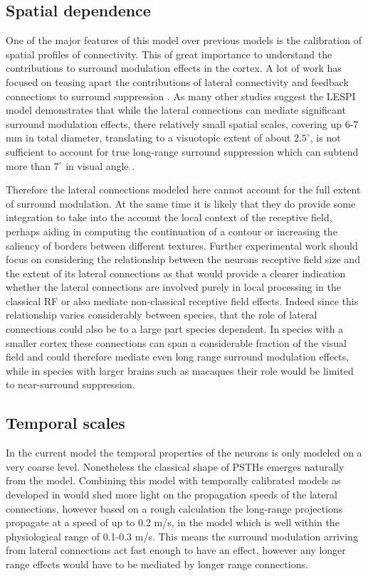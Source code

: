 \subsection{Spatial dependence}

One of the major features of this model over previous models is the
calibration of spatial profiles of connectivity. This of great
importance to understand the contributions to surround modulation
effects in the cortex. A lot of work has focused on teasing apart the
contributions of lateral connectivity and feedback connections to
surround suppression \citep{Angelucci2002, Bair2003, Schwabe2006}. As
many other studies suggest the LESPI model demonstrates that while the
lateral connections can mediate significant surround modulation
effects, there relatively small spatial scales, covering up 6-7 mm in
total diameter, translating to a visuotopic extent of about
$2.5^\circ$, is not sufficient to account for true long-range surround
suppression which can subtend more than $7^\circ$ in visual angle
\citep{Bair2003, Levitt2002}.

Therefore the lateral connections modeled here cannot account for the
full extent of surround modulation. At the same time it is likely that
they do provide some integration to take into the account the local
context of the receptive field, perhaps aiding in computing the
continuation of a contour or increasing the saliency of borders
between different textures. Further experimental work should focus on
considering the relationship between the neurons receptive field size
and the extent of its lateral connections as that would provide a
clearer indication whether the lateral connections are involved purely
in local processing in the classical RF or also mediate non-classical
receptive field effects. Indeed since this relationship varies
considerably between species, that the role of lateral connections
could also be to a large part species dependent. In species with a
smaller cortex these connections can span a considerable fraction of
the visual field and could therefore mediate even long range surround
modulation effects, while in species with larger brains such as
macaques their role would be limited to near-surround suppression.

\subsection{Temporal scales}

In the current model the temporal properties of the neurons is only
modeled on a very coarse level. Nonetheless the classical shape of
PSTHs emerges naturally from the model. Combining this model with
temporally calibrated models as developed in \citep{StevensPhD2016}
would shed more light on the propagation speeds of the lateral
connections, however based on a rough calculation the long-range
projections propagate at a speed of up to 0.2 m/s, in the model which
is well within the physiological range of 0.1-0.3 m/s. This means the
surround modulation arriving from lateral connections act fast enough
to have an effect, however any longer range effects would have to be
mediated by longer range connections.

